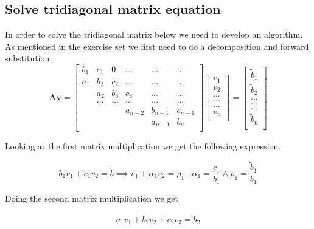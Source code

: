 \documentclass[reprint, english,notitlepage]{revtex4-1}  %
\begin{document}
\subsection{Solve tridiagonal matrix equation}

In order to solve the tridiagonal matrix below we need to develop an algorithm. As mentioned in the exercise set \citep{oppgavetekst} we first need to do a decomposition and forward substitution.
\begin{equation}
\mathbf{A}\mathbf{v} = \begin{bmatrix}
b_1& c_1 & 0 &\dots   & \dots &\dots \\
a_1 & b_2 & c_2 &\dots &\dots &\dots \\
& a_2 & b_3 & c_3 & \dots & \dots \\
& \dots   & \dots &\dots   &\dots & \dots \\
&   &  &a_{n-2}  &b_{n-1}& c_{n-1} \\
&    &  &   &a_{n-1} & b_n \\
\end{bmatrix}\begin{bmatrix}
v_1\\
v_2\\
\dots \\
\dots  \\
\dots \\
v_n\\
\end{bmatrix}
=\begin{bmatrix}
\tilde{b}_1\\
\tilde{b}_2\\
\dots \\
\dots \\
\dots \\
\tilde{b}_n\\
\end{bmatrix}
\label{eq:mat_gen}
\end{equation}

Looking at the first matrix multiplication we get the following expression.

\begin{equation}
	b_1 v_1 + c_1 v_2 = \tilde{b} \implies v_1 + \alpha_1 v_2 = \rho _1, \ \ \alpha_1 = \frac{c_1}{b_1} \wedge \rho_1 = \frac{\tilde{b}_1}{b_1} 
	\label{eq:mat1}
\end{equation}

Doing the second matrix multiplication we get

\begin{equation}
	a_1 v_1 + b_2 v_2 + c_2 v_3 = \tilde{b}_2
	\label{eq:mat2}
\end{equation}
\end{document}
